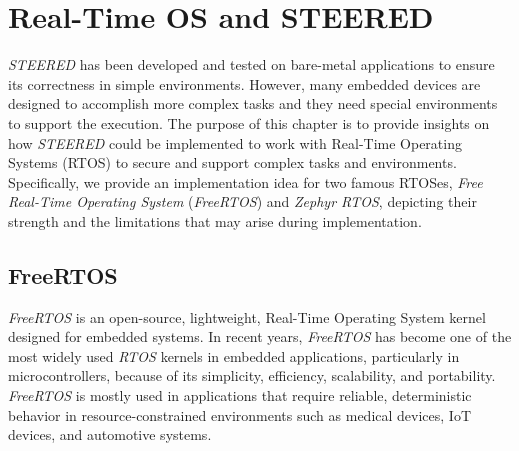 \chapter{Real-Time OS and STEERED}
\label{cha:rtos}

\textit{STEERED} has been developed and tested on bare-metal applications to ensure
its correctness in simple environments. However, many embedded devices are designed
to accomplish more complex tasks and they need special environments to support the
execution. The purpose of this chapter is to provide insights on how \textit{STEERED}
could be implemented to work with Real-Time Operating Systems (RTOS) to secure and
support complex tasks and environments. Specifically, we provide an implementation
idea for two famous RTOSes, \textit{Free Real-Time Operating System} (\textit{FreeRTOS})
and \textit{Zephyr RTOS}, depicting their strength and the limitations that may
arise during implementation.

\section{FreeRTOS}
\label{sec:rtos_rtos}

\textit{FreeRTOS}\cite{freertos} is an open-source, lightweight, Real-Time Operating
System kernel designed for embedded systems. In recent years, \textit{FreeRTOS}
has become one of the most widely used \textit{RTOS} kernels in embedded applications,
particularly in microcontrollers, because of its simplicity, efficiency, scalability,
and portability. \textit{FreeRTOS} is mostly used in applications that require
reliable, deterministic behavior in resource-constrained environments such as medical
devices, IoT devices, and automotive systems.

